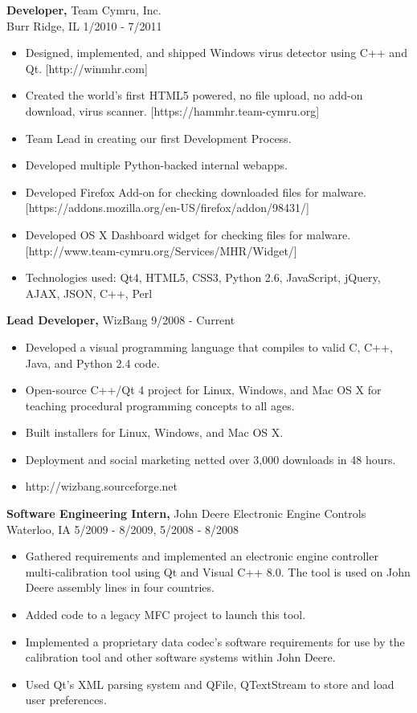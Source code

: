 \documentclass[margin]{res}
\begin{document}
\begin{resume}
{\bf Developer,} Team Cymru, Inc.\\ Burr Ridge, IL \hfill 1/2010 - 7/2011
\begin{itemize} \itemsep -2pt  %
\item Designed, implemented, and shipped Windows virus detector using C++ and Qt.  [http://winmhr.com]
\item Created the world's first HTML5 powered, no file upload, no add-on download, virus scanner. [https://hammhr.team-cymru.org]
\item Team Lead in creating our first Development Process.
\item Developed multiple Python-backed internal webapps.
\item Developed Firefox Add-on for checking downloaded files for malware. [https://addons.mozilla.org/en-US/firefox/addon/98431/]
\item Developed OS X Dashboard widget for checking files for malware. [http://www.team-cymru.org/Services/MHR/Widget/]
\item Technologies used: Qt4, HTML5, CSS3, Python 2.6, JavaScript, jQuery, AJAX, JSON, C++, Perl
\end{itemize}

{\bf Lead Developer,} WizBang \hfill 9/2008 - Current
\begin{itemize} \itemsep -2pt  %
\item Developed a visual programming language that compiles to valid C, C++, Java, and Python 2.4 code.
\item Open-source C++/Qt 4 project for Linux, Windows, and Mac OS X for teaching procedural programming concepts to all ages.
\item Built installers for Linux, Windows, and Mac OS X.
\item Deployment and social marketing netted over 3,000 downloads in 48 hours.
\item http://wizbang.sourceforge.net
\end{itemize}

{\bf Software Engineering Intern,} John Deere Electronic Engine Controls\\ Waterloo, IA \hfill 5/2009 - 8/2009, 5/2008 - 8/2008
\begin{itemize} \itemsep -2pt  %
\item Gathered requirements and implemented an electronic engine controller multi-calibration tool using Qt and Visual C++ 8.0.  The tool is used on John Deere assembly lines in four countries.
\item Added code to a legacy MFC project to launch this tool.
\item Implemented a proprietary data codec's software requirements for use by the calibration tool and other software systems within John Deere.
\item Used Qt's XML parsing system and QFile, QTextStream to store and load user preferences.



\end{itemize}
\end{resume}
\end{document}
